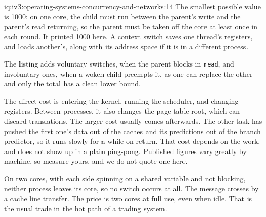 \begin{solution}{iq:iv3:operating-systems-concurrency-and-networks:14}
The smallest possible value is 1000: on one core, the child must run between the parent's write and the parent's read returning, so the parent must be taken off the core at least once in each round. It printed 1000 here. A context switch saves one thread's registers, and loads another's, along with its address space if it is in a different process.

The listing adds voluntary switches, when the parent blocks in \texttt{read}, and involuntary ones, when a woken child preempts it, as one can replace the other and only the total has a clean lower bound.

The direct cost is entering the kernel, running the scheduler, and changing registers. Between processes, it also changes the page-table root, which can discard translations. The larger cost usually comes afterwards. The other task has pushed the first one's data out of the caches and its predictions out of the branch predictor, so it runs slowly for a while on return. That cost depends on the work, and does not show up in a plain ping-pong. Published figures vary greatly by machine, so measure yours, and we do not quote one here.

On two cores, with each side spinning on a shared variable and not blocking, neither process leaves its core, so no switch occurs at all. The message crosses by a cache line transfer. The price is two cores at full use, even when idle. That is the usual trade in the hot path of a trading system.

\end{solution}


